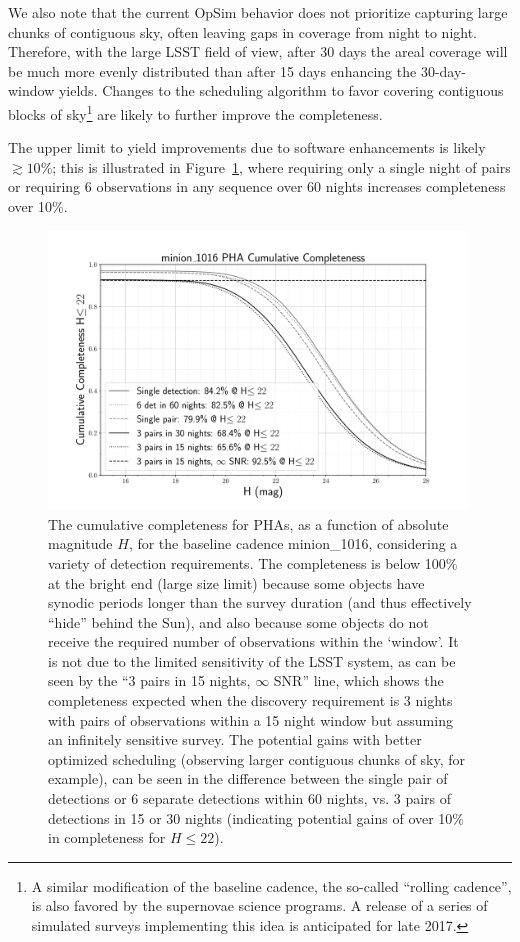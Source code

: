 We also note that the current OpSim behavior does not prioritize capturing large chunks of contiguous sky, often leaving gaps in coverage from night to night. Therefore, with the large LSST field of view, after 30 days the areal coverage will be much more evenly distributed than after 15 days enhancing the 30-day-window yields.
Changes to the scheduling algorithm to favor covering contiguous blocks of sky\footnote{A similar modification of
the baseline cadence, the so-called ``rolling cadence'', is also favored by the supernovae science programs. A release of a series of simulated surveys implementing this idea is anticipated for late 2017.} are likely to further improve the completeness.

The upper limit to yield improvements due to software enhancements is likely $\gtrsim 10$\%; this is illustrated in Figure~\ref{fig:more_completeness}, where requiring only a single night of pairs or requiring 6 observations in any sequence over 60 nights increases completeness over 10\%.


\begin{figure}[t!]
\centering
\includegraphics[width=0.99\textwidth]{figures/minion_1016_pha_More_Cumulative_Completeness}
\vskip -0.2in
\caption{The cumulative completeness for PHAs, as a function of absolute magnitude $H$, for the baseline
cadence minion\_1016, considering a variety of detection requirements. The completeness is below 100\% at the bright end (large size limit) because some objects have
synodic periods longer than the survey duration (and thus effectively ``hide'' behind the Sun), and also because some objects do not receive the required number of observations within the `window'. It is not due to the limited sensitivity of the LSST system, as can be seen by the ``3 pairs in 15 nights, $\infty$ SNR'' line, which shows the completeness expected when the discovery requirement is 3 nights with pairs of observations within a 15 night window but assuming an infinitely sensitive survey. The potential gains with better optimized scheduling (observing larger contiguous chunks of sky, for example), can be seen in the difference between the single pair of detections or 6 separate detections within 60 nights, vs. 3 pairs of detections in 15 or 30 nights (indicating potential gains of over 10\% in completeness for $H\le22$). \label{fig:more_completeness}}
\end{figure}

